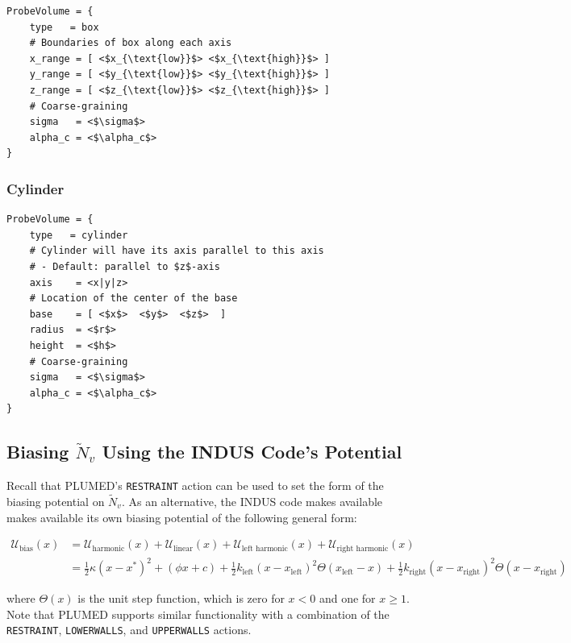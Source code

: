 \documentclass[11pt,notitlepage]{article}
\begin{document}
\begin{lstlisting}
ProbeVolume = {
	type   = box
	# Boundaries of box along each axis
	x_range = [ <$x_{\text{low}}$> <$x_{\text{high}}$> ]
	y_range = [ <$y_{\text{low}}$> <$y_{\text{high}}$> ]
	z_range = [ <$z_{\text{low}}$> <$z_{\text{high}}$> ]
	# Coarse-graining
	sigma   = <$\sigma$>
	alpha_c = <$\alpha_c$>
}
\end{lstlisting}


\subsubsection{Cylinder}

\begin{lstlisting}
ProbeVolume = {
	type   = cylinder
	# Cylinder will have its axis parallel to this axis 
	# - Default: parallel to $z$-axis
	axis    = <x|y|z>
	# Location of the center of the base
	base    = [ <$x$>  <$y$>  <$z$>  ]
	radius  = <$r$>
	height  = <$h$>
	# Coarse-graining
	sigma   = <$\sigma$>
	alpha_c = <$\alpha_c$>
}
\end{lstlisting}


\subsection{Biasing $\tilde{N}_v$ Using the INDUS Code's Potential}

Recall that PLUMED's \texttt{RESTRAINT} action can be used to set the form of the biasing potential on $\tilde{N}_v$. As an alternative, the INDUS code makes available makes available its own biasing potential of the following general form:

\begin{align}
	\mathcal{U}_{\text{bias}}(x) 
	&= \mathcal{U}_{\text{harmonic}}(x) + \mathcal{U}_{\text{linear}}(x)
	     + \mathcal{U}_{\text{left harmonic}}(x) + \mathcal{U}_{\text{right harmonic}}(x) \\
	\label{eqn:generalbias}
	&= \frac{1}{2} \kappa (x - x^*)^2 + (\phi x + c)
	   + \frac{1}{2} k_{\text{left}}  (x - x_{\text{left}})^2 \Theta(x_{\text{left}} - x)
	   + \frac{1}{2} k_{\text{right}} (x - x_{\text{right}})^2 \Theta(x - x_{\text{right}})
\end{align}

\noindent where $\Theta(x)$ is the unit step function, which is zero for $x < 0$ and one for $x \ge 1$. Note that PLUMED supports similar functionality with a combination of the \texttt{RESTRAINT}, \texttt{LOWERWALLS}, and \texttt{UPPERWALLS} actions.
\end{document}
